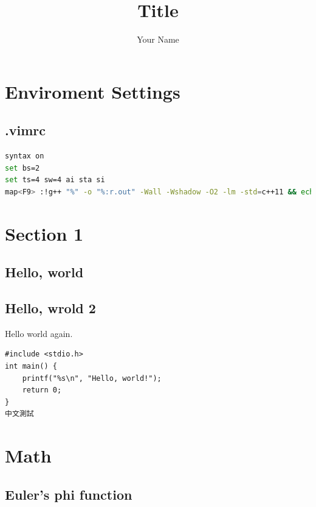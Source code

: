 \documentclass[11pt,twocolumn,a4paper]{article}
\title{Title}
\author{Your Name}
\begin{document}
\setlength{\headheight}{30pt}
\pagestyle{fancy}
\fancyhead[R]{\thepage}
\fancyfoot{}


\renewcommand{\contentsname}{Index}
\tableofcontents


\newpage
\section{Enviroment Settings}
\subsection{.vimrc}
\begin{lstlisting}[label=.vimrc,language=bash]
syntax on
set bs=2
set ts=4 sw=4 ai sta si
map<F9> :!g++ "%" -o "%:r.out" -Wall -Wshadow -O2 -lm -std=c++11 && echo "===== done =====" && "./%:r.out"
\end{lstlisting}


\newpage
\section{Section 1}

\subsection{Hello, world}


\subsection{Hello, wrold 2}
Hello world again.
\begin{lstlisting}[label=test]
#include <stdio.h>
int main() {
	printf("%s\n", "Hello, world!");
	return 0;
}
中文測試
\end{lstlisting}


\newpage
\section{Math}
\subsection{Euler's phi function}
\end{document}
